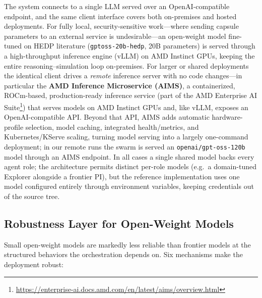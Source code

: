 \documentclass[conference]{IEEEtran}
\begin{document}
The system connects to a single LLM served over an OpenAI-compatible endpoint, and the same client interface covers both on-premises and hosted deployments.  For fully local, security-sensitive work---where sending capsule parameters to an external service is undesirable---an open-weight model fine-tuned on HEDP literature (\texttt{gptoss-20b-hedp}, 20B parameters) is served through a high-throughput inference engine (vLLM) on AMD Instinct GPUs, keeping the entire reasoning--simulation loop on-premises.  For larger or shared deployments the identical client drives a \emph{remote} inference server with no code changes---in particular the \textbf{AMD Inference Microservice (AIMS)}, a containerized, ROCm-based, production-ready inference service (part of the AMD Enterprise AI Suite\footnote{\url{https://enterprise-ai.docs.amd.com/en/latest/aims/overview.html}}) that serves models on AMD Instinct GPUs and, like vLLM, exposes an OpenAI-compatible API.  Beyond that API, AIMS adds automatic hardware-profile selection, model caching, integrated health/metrics, and Kubernetes/KServe scaling, turning model serving into a largely one-command deployment; in our remote runs the swarm is served an \texttt{openai/gpt-oss-120b} model through an AIMS endpoint.  In all cases a single shared model backs every agent role; the architecture permits distinct per-role models (e.g.\ a domain-tuned Explorer alongside a frontier PI), but the reference implementation uses one model configured entirely through environment variables, keeping credentials out of the source tree.

\subsection{Robustness Layer for Open-Weight Models}

Small open-weight models are markedly less reliable than frontier models at the structured behaviors the orchestration depends on.  Six mechanisms make the deployment robust:
\end{document}

